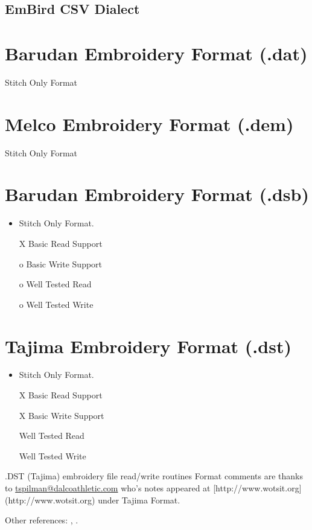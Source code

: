 \documentclass{report}
\begin{document}
\subsection{EmBird CSV Dialect}

\section{Barudan Embroidery Format (.dat)}

Stitch Only Format

\section{Melco Embroidery Format (.dem)}

Stitch Only Format

\section{Barudan Embroidery Format (.dsb)}

\begin{itemize}
\item Stitch Only Format.
\item [X] Basic Read Support
\item [o] Basic Write Support
\item [o] Well Tested Read
\item [o] Well Tested Write
\end{itemize}

\section{Tajima Embroidery Format (.dst)}

\begin{itemize}
\item Stitch Only Format.
\item [X] Basic Read Support
\item [X] Basic Write Support
\item [ ] Well Tested Read
\item [ ] Well Tested Write
\end{itemize}

.DST (Tajima) embroidery file read/write routines
Format comments are thanks to \url{tspilman@dalcoathletic.com} who's
notes appeared at [http://www.wotsit.org](http://www.wotsit.org) under Tajima Format.

Other references: \cite{kde_tajima}, \cite{acatina}.
\end{document}
